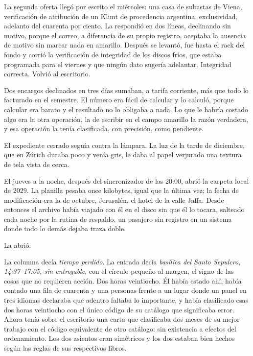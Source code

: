 La segunda oferta llegó por escrito el miércoles: una casa de subastas de Viena, verificación de atribución de un Klimt de procedencia argentina, exclusividad, adelanto del cuarenta por ciento. La respondió en dos líneas, declinando sin motivo, porque el correo, a diferencia de su propio registro, aceptaba la ausencia de motivo sin marcar nada en amarillo. Después se levantó, fue hasta el rack del fondo y corrió la verificación de integridad de los discos fríos, que estaba programada para el viernes y que ningún dato sugería adelantar. Integridad correcta. Volvió al escritorio.

Dos encargos declinados en tres días sumaban, a tarifa corriente, más que todo lo facturado en el semestre. El número era fácil de calcular y lo calculó, porque calcular era barato y el resultado no lo obligaba a nada. Lo que le habría costado algo era la otra operación, la de escribir en el campo amarillo la razón verdadera, y esa operación la tenía clasificada, con precisión, como pendiente.

El expediente cerrado seguía contra la lámpara. La luz de la tarde de diciembre, que en Zúrich duraba poco y venía gris, le daba al papel verjurado una textura de tela vista de cerca.

El jueves a la noche, después del sincronizador de las 20:00, abrió la carpeta local de 2029. La planilla pesaba once kilobytes, igual que la última vez; la fecha de modificación era la de octubre, Jerusalén, el hotel de la calle Jaffa. Desde entonces el archivo había viajado con él en el disco sin que él lo tocara, salteado cada noche por la rutina de respaldo, un pasajero sin registro en un sistema donde todo lo demás dejaba traza doble.

La abrió.

La columna decía \textit{tiempo perdido}. La entrada decía \textit{basílica del Santo Sepulcro, 14:37--17:05, sin entregable}, con el círculo pequeño al margen, el signo de las cosas que no requieren acción. Dos horas veintiocho. Él había estado ahí, había contado una fila de cuarenta y una personas frente a un lugar donde un panel en tres idiomas declaraba que adentro faltaba lo importante, y había clasificado esas dos horas veintiocho con el único código de su catálogo que significaba error. Ahora tenía sobre el escritorio una carta que clasificaba dos meses de su mejor trabajo con el código equivalente de otro catálogo: sin existencia a efectos del ordenamiento. Los dos asientos eran simétricos y los dos estaban bien hechos según las reglas de sus respectivos libros.

